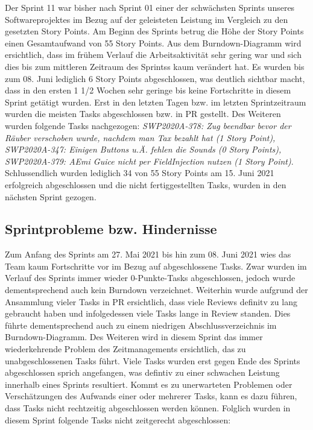 \documentclass[12pt,a4paper, oneside]{article}
\begin{document}
\noindent
Der Sprint 11 war bisher nach Sprint 01 einer der schwächsten Sprints unseres Softwareprojektes im Bezug auf der geleisteten Leistung im Vergleich
zu den gesetzten Story Points. Am Beginn des Sprints betrug die Höhe der Story Points einen Gesamtaufwand von 55 Story Points.
Aus dem Burndown-Diagramm wird ersichtlich, dass im frühem Verlauf die Arbeitsaktivität sehr gering war und sich dies bis zum mittleren
Zeitraum des Sprintss kaum verändert hat. Es wurden bis zum 08. Juni lediglich 6 Story Points abgeschlossen, was deutlich sichtbar macht, dass in den
ersten 1 1/2 Wochen sehr geringe bis keine Fortschritte in diesem Sprint getätigt wurden. Erst in den letzten Tagen bzw. im letzten Sprintzeitraum
wurden die meisten Tasks abgeschlossen bzw. in PR gestellt.
Des Weiteren wurden folgende Tasks nachgezogen: \textit{SWP2020A-378: Zug beendbar bevor der Räuber verschoben wurde, nachdem man Tax bezahlt hat (1 Story Point), SWP2020A-347: Einigen Buttons u.Ä. fehlen die Sounds (0 Story Points), SWP2020A-379: AEmi Guice nicht per FieldInjection nutzen (1 Story Point)}.
Schlussendlich wurden lediglich 34 von 55 Story Points am 15. Juni 2021 erfolgreich abgeschlossen und die nicht fertiggestellten Tasks,
wurden in den nächsten Sprint gezogen.

\newpage

\subsection{Sprintprobleme bzw. Hindernisse}

Zum Anfang des Sprints am 27. Mai 2021 bis hin zum 08. Juni 2021 wies das Team kaum Fortschritte vor im Bezug auf
abgeschlossene Tasks. Zwar wurden im Verlauf des Sprints immer wieder 0-Punkte-Tasks abgeschlossen, jedoch wurde
dementsprechend auch kein Burndown verzeichnet. Weiterhin wurde aufgrund der Ansammlung vieler Tasks in PR ersichtlich, dass viele Reviews definitv
zu lang gebraucht haben und infolgedessen viele Tasks lange in Review standen.
Dies führte dementsprechend auch zu einem niedrigen Abschlussverzeichnis im Burndown-Diagramm.
Des Weiteren wird in diesem Sprint das immer wiederkehrende Problem des Zeitmanagements ersichtlich, das zu unabgeschlossenen Tasks führt.
Viele Tasks wurden erst gegen Ende des Sprints abgeschlossen sprich angefangen, was defintiv zu einer schwachen Leistung innerhalb eines Sprints
resultiert. Kommt es zu unerwarteten Problemen oder Verschätzungen des Aufwands einer oder mehrerer Tasks, kann es dazu führen, dass Tasks nicht
rechtzeitig abgeschlossen werden können. Folglich wurden in diesem Sprint folgende Tasks nicht zeitgerecht abgeschlossen:
\end{document}
